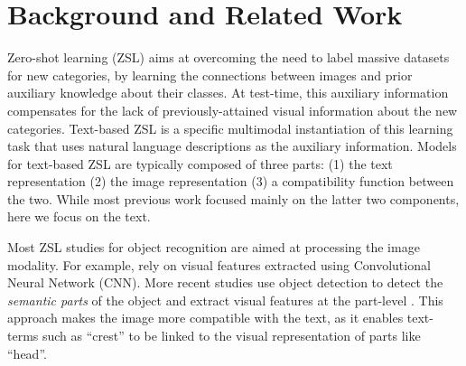\documentclass[11pt,a4paper]{article}
\newcommand\yuval[1]{\textcolor{darkpink}{\textbf{YUVAL:} #1 }}
\newcommand\tzuf[1]{\textcolor{blue}{\textbf{TZUF:} #1 }}
\newcommand\reut[1]{\textcolor{green}{\textbf{REUT:} #1 }}
\begin{document}
\section{Background and Related Work}
Zero-shot learning (ZSL) %
aims at overcoming the need to label massive datasets for new categories, by learning the connections between images and prior auxiliary knowledge about their classes. At test-time, this auxiliary information compensates for the lack of previously-attained visual information about the new categories.
Text-based ZSL is a specific multimodal instantiation of this learning task that uses natural language descriptions as the auxiliary information. Models for text-based ZSL are typically composed of three parts: (1) the text representation (2) the image representation (3) a compatibility function between the two.  While most previous work focused mainly on the latter two components, here we %
focus on the text. 

Most ZSL studies  for object recognition are aimed at processing the image modality. For example, \citet{xu2018attngan,lei2015predicting,qiao2016less,akata2016multi} rely on visual features extracted using 
Convolutional Neural Network (CNN). More recent studies use object detection to detect the {\em semantic parts} of the object and extract visual features at the part-level \cite{elhoseiny2017link,zhu2018generative,zhang2016spda}. This
approach makes the image more compatible with the text, as it enables text-terms such as \enquote{crest} to be linked to the visual representation of parts like \enquote{head}. 
\end{document}
